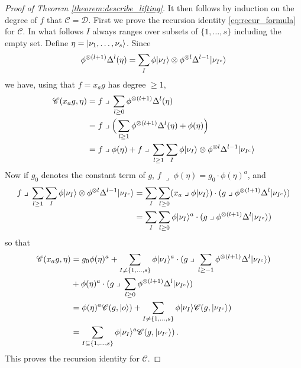\documentclass[english,letter paper,12pt,reqno]{article}
\DeclarePairedDelimiter\ket{\lvert}{\rangle}
\theoremstyle{example}
\numberwithin{equation}{section}
\def\contract{\;\lrcorner\;}
\begin{document}
\begin{proof}[Proof of Theorem \ref{theorem:describe_lifting}]
It then follows by induction on the degree of $f$ that $\mathscr{C} = \mathscr{D}$. First we prove the recursion identity \eqref{eq:recur_formula} for $\mathscr{C}$. In what follows $I$ always ranges over subsets of $\{ 1, \ldots, s \}$ including the empty set. Define $\eta = \ket{\nu_1,\ldots,\nu_s}$. Since
\[
\phi^{\otimes(l+1)} \Delta^l( \eta ) = \sum_I \phi \ket{\nu_I} \otimes \phi^{\otimes l} \Delta^{l-1} \ket{\nu_{I^c}}
\]
we have, using that $f = x_a g$ has degree $\ge 1$,
\begin{align*}
\mathscr{C}( x_a g, \eta ) &= f \contract \sum_{l \ge 0} \phi^{\otimes (l+1)} \Delta^l ( \eta )\\
&= f \contract \Big( \sum_{l \ge 1} \phi^{\otimes (l+1)} \Delta^l( \eta ) + \phi( \eta ) \Big)\\
&= f \contract \phi( \eta ) + f \contract \sum_{l \ge 1} \sum_I \phi \ket{\nu_I} \otimes \phi^{\otimes l} \Delta^{l-1} \ket{\nu_{I^c}}
\end{align*}
Now if $g_0$ denotes the constant term of $g$, $f \contract \phi( \eta ) = g_0 \cdot \phi( \eta )^a$, and
\begin{align*}
f \contract \sum_{l \ge 1} \sum_I \phi \ket{\nu_I} \otimes \phi^{\otimes l} \Delta^{l-1} \ket{\nu_{I^c}} &= \sum_I \sum_{l \ge 0} ( x_a \contract \phi\ket{\nu_I} ) \cdot ( g \contract \phi^{\otimes (l+1)} \Delta^l \ket{\nu_{I^c}})\\
&= \sum_I \sum_{l \ge 0} \phi\ket{\nu_I}^a \cdot ( g \contract \phi^{\otimes (l+1)} \Delta^l \ket{\nu_{I^c}})
\end{align*}
so that
\begin{align*}
\mathscr{C}( x_a g, \eta ) &= g_0 \phi( \eta )^a + \sum_{I \neq \{1,\ldots,s\}} \phi \ket{\nu_I}^a \cdot ( g \contract \sum_{l \ge -1} \phi^{\otimes (l+1)} \Delta^l \ket{\nu_{I^c}})\\
&+ \phi( \eta )^a \cdot ( g \contract \sum_{l \ge 0} \phi^{\otimes (l+1)} \Delta^l \ket{\nu_{I^c}})\\
&= \phi( \eta )^a \mathscr{C}(g, \ket{o}) + \sum_{I \neq \{1,\ldots,s\}} \phi \ket{\nu_I} \mathscr{C}(g, \ket{\nu_{I^c}})\\
&= \sum_{I \subseteq \{ 1,\ldots,s\}} \phi\ket{\nu_I}^a \mathscr{C}( g, \ket{\nu_{I^c}})\,.
\end{align*}
This proves the recursion identity for $\mathscr{C}$. 


\end{proof}
\end{document}
